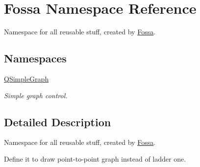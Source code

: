 \hypertarget{namespace_fossa}{}\section{Fossa Namespace Reference}
\label{namespace_fossa}


Namespace for all reusable stuff, created by \hyperlink{namespace_fossa}{Fossa}.  


\subsection*{Namespaces}
\begin{DoxyCompactItemize}
\item 
 \hyperlink{namespace_fossa_1_1_q_simple_graph}{Q\+Simple\+Graph}
\begin{DoxyCompactList}\small\item\em Simple graph control. \end{DoxyCompactList}\end{DoxyCompactItemize}


\subsection{Detailed Description}
Namespace for all reusable stuff, created by \hyperlink{namespace_fossa}{Fossa}. 

Define it to draw point-\/to-\/point graph instead of ladder one. 